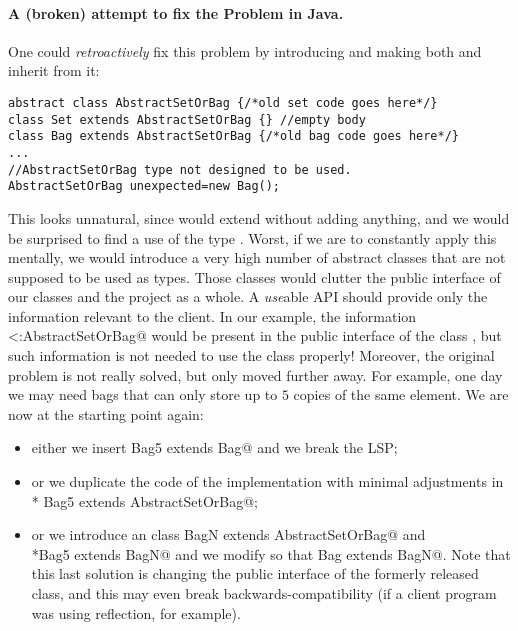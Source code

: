 \paragraph{A (broken) attempt to fix the Problem in Java.}
One could \emph{retroactively} fix this problem by introducing \Q@AbstractSetOrBag@
and making both \Q@Bag@ and \Q@Set@ inherit from it:
\saveSpace\saveSpace
\begin{lstlisting}
abstract class AbstractSetOrBag {/*old set code goes here*/}
class Set extends AbstractSetOrBag {} //empty body
class Bag extends AbstractSetOrBag {/*old bag code goes here*/}
...
//AbstractSetOrBag type not designed to be used.
AbstractSetOrBag unexpected=new Bag(); 
\end{lstlisting}
\saveSpace\saveSpace
This looks unnatural, since \Q@Set@ would extend \Q@AbstractSetOrBag@ without adding anything,
and we would be surprised to find a use of the type \Q@AbstractSetOrBag@.
Worst, if we are to constantly apply this mentally, we would introduce a very high number
of abstract classes that are not supposed to be used as types. Those classes would clutter the 
public interface of our classes and the project as a whole.
A \emph{use}able API should provide only the information relevant to the client.
In our example, the information \Q@Set<:AbstractSetOrBag@ would be present in the public interface
of the class \Q@Set@, but such information is not needed to use the class properly!
Moreover, the original problem is not really solved, but only moved 
further away. For example, one day  we may need bags that can only store up to $5$ copies of the same element.
We are now at the starting point again:
\begin{itemize}
\item either we insert \Q@class Bag5 extends Bag@ and we break the LSP; 
\item or we duplicate the code of the \Q@Bag@ implementation with minimal
  adjustments in \\* \Q@class Bag5 extends AbstractSetOrBag@;
\item or we introduce an
\Q@abstract class BagN extends AbstractSetOrBag@ and \\*\Q@class Bag5 extends BagN@
and we modify \Q@Bag@ so that  \Q@class Bag extends BagN@.
Note that this last solution is changing the public interface of the formerly released \Q@Bag@ class, and
this may even break backwards-compatibility (if a client program was using
reflection, for example).
\end{itemize}

